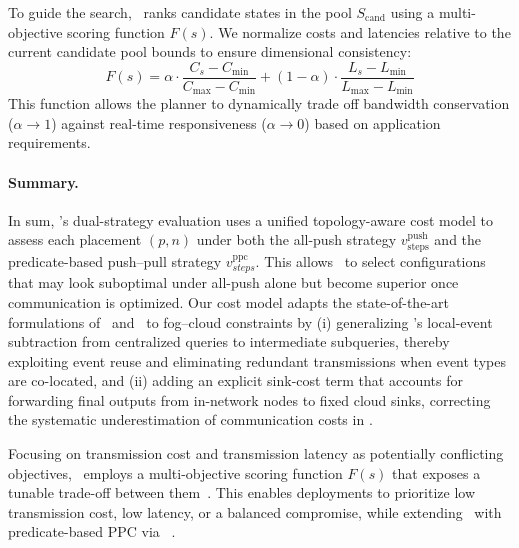 To guide the search, \we\ ranks candidate states in the pool $S_{\text{cand}}$ using a multi-objective scoring function $F(s)$. We normalize costs and latencies relative to the current candidate pool bounds to ensure dimensional consistency:
\begin{equation}\label{eq:scoring_function}
    F(s) = \alpha \cdot \frac{C_s - C_{\min}}{C_{\max} - C_{\min}} + (1-\alpha) \cdot \frac{L_s - L_{\min}}{L_{\max} - L_{\min}}
\end{equation}
This function allows the planner to dynamically trade off bandwidth conservation ($\alpha \to 1$) against real-time responsiveness ($\alpha \to 0$) based on application requirements.

\paragraph{Summary.}
In sum, \we's dual-strategy evaluation uses a unified topology-aware cost model to assess each placement $(p,n)$ under both the all-push strategy $v_{\text{steps}}^{\text{push}}$ and the predicate-based push–pull strategy $v_{steps}^{\text{ppc}}$. This allows \we~to select configurations that may look suboptimal under all-push alone but become superior once communication is optimized. Our cost model adapts the state-of-the-art formulations of \inev~and \prepp~to fog–cloud constraints by (i) generalizing \prepp's local-event subtraction from centralized queries to intermediate subqueries, thereby exploiting event reuse and eliminating redundant transmissions when event types are co-located, and (ii) adding an explicit sink-cost term that accounts for forwarding final outputs from in-network nodes to fixed cloud sinks, correcting the systematic underestimation of communication costs in \inev.

Focusing on transmission cost and transmission latency as potentially conflicting objectives, \we~employs a multi-objective scoring function $F(s)$ that exposes a tunable trade-off between them~\cite{cugola2013deployment,akdere2008plan}. This enables deployments to prioritize low transmission cost, low latency, or a balanced compromise, while extending \inev\ with predicate-based PPC via \prepp~\cite{DBLP:journals/pacmmod/AkiliP023,PushPullSamira}.

